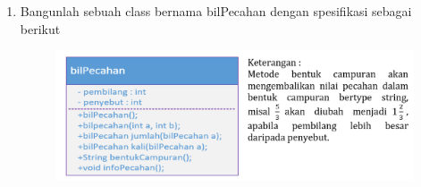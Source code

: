 \documentclass[a4paper, 12pt]{article}
\begin{document}
\begin{enumerate}
\begin{lstlisting}[language=java, breaklines=true, escapeinside={$}{$}]
public class No4 {
    public static void main(String[] args) {
        Scanner input = new Scanner(System.in);
        System.out.print("Masukkan radius: ");
        int r = input.nextInt();
        System.out.print("Masukkan height: ");
        int h = input.nextInt();
            
        Cylinder obj = new Cylinder(r,h);
        System.out.println(obj.toString());
        System.out.println("Luas Permukaan : " + obj.getArea());
        System.out.println("Volume : "+ obj.getVolume());
            
        Circle obj2 = new Circle(r);
        System.out.println(obj2.toString());
        System.out.println("Luas : " + obj2.getArea());
    }
}
    
class Circle {
    private double radius;
    
    public Circle(int x){
        radius = x;
    }
    public double getRadius(){
        return radius;
    }
    public String toString(){
        return "Circle[] dengan radius "+ radius;
    } 
    public double getArea(){
        return Math.PI*radius*radius;
    } 
}
    
class Cylinder extends Circle{
    private double height;
    public Cylinder(int x, int t){
        super(x); height = t;
    }
    public double getHeight(){
        return height;
    }
    public double getVolume (){
        return Math.PI*getRadius()*getRadius()*height;
    } 
    public String toString (){
        return "Cylinder[] dengan radius "+getRadius()+" dan tinggi "+ height;
    }
    public double getArea(){
        return 2*Math.PI*getRadius()*(getRadius()+height);
    } 
}
    \end{lstlisting}

    \item Bangunlah sebuah class bernama bilPecahan dengan spesifikasi sebagai berikut
    \begin{figure}[h]
        \centering
        \includegraphics[width=1\linewidth]{No5.png}
    \end{figure}


\end{enumerate}
\end{document}
